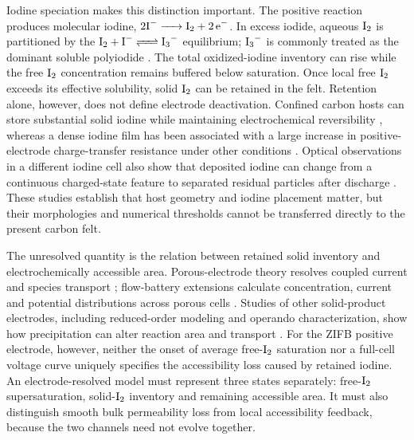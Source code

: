 \documentclass[11pt]{article}
\begin{document}
Iodine speciation makes this distinction important. The positive reaction produces molecular iodine, $2\ce{I^- -> I2 + 2e^-}$. In excess iodide, aqueous $\ce{I2}$ is partitioned by the $\ce{I2 + I^- <=> I3^-}$ equilibrium; $\ce{I3^-}$ is commonly treated as the dominant soluble polyiodide \citep{Palmer1984,Wen2025}. The total oxidized-iodine inventory can rise while the free $\ce{I2}$ concentration remains buffered below saturation. Once local free $\ce{I2}$ exceeds its effective solubility, solid $\ce{I2}$ can be retained in the felt. Retention alone, however, does not define electrode deactivation. Confined carbon hosts can store substantial solid iodine while maintaining electrochemical reversibility \citep{SolidI2_NatCommun2020,Fitzek2023}, whereas a dense iodine film has been associated with a large increase in positive-electrode charge-transfer resistance under other conditions \citep{Jang2021}. Optical observations in a different iodine cell also show that deposited iodine can change from a continuous charged-state feature to separated residual particles after discharge \citep{LiDualPlate2025}. These studies establish that host geometry and iodine placement matter, but their morphologies and numerical thresholds cannot be transferred directly to the present carbon felt.

The unresolved quantity is the relation between retained solid inventory and electrochemically accessible area. Porous-electrode theory resolves coupled current and species transport \citep{Newman1962,Tichter2020}; flow-battery extensions calculate concentration, current and potential distributions across porous cells \citep{Chakrabarti2020,AparicioMauricio2023}. Studies of other solid-product electrodes, including reduced-order modeling and operando characterization, show how precipitation can alter reaction area and transport \citep{LiS_ROM_JES2025,ZnO_EEM2024,Li2S_EcoMat2024}. For the ZIFB positive electrode, however, neither the onset of average free-$\ce{I2}$ saturation nor a full-cell voltage curve uniquely specifies the accessibility loss caused by retained iodine. An electrode-resolved model must represent three states separately: free-$\ce{I2}$ supersaturation, solid-$\ce{I2}$ inventory and remaining accessible area. It must also distinguish smooth bulk permeability loss from local accessibility feedback, because the two channels need not evolve together.
\end{document}
